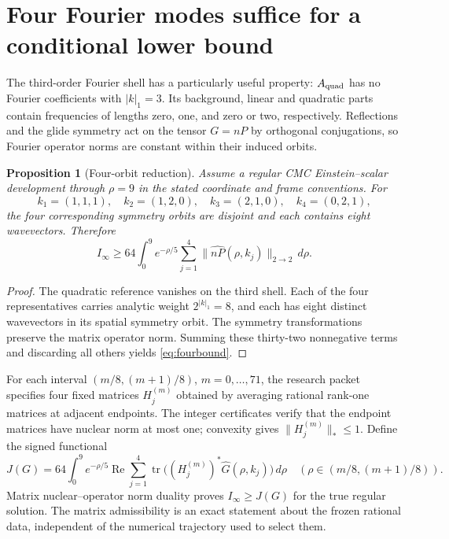 \documentclass[11pt,a4paper]{article}
\newtheorem{proposition}[theorem]{Proposition}
\theoremstyle{remark}
\begin{document}
\section{Four Fourier modes suffice for a conditional lower bound}
The third-order Fourier shell has a particularly useful property: $A_{\rm quad}$ has no Fourier coefficients with $|k|_1=3$. Its background, linear and quadratic parts contain frequencies of lengths zero, one, and zero or two, respectively. Reflections and the glide symmetry act on the tensor $G=nP$ by orthogonal conjugations, so Fourier operator norms are constant within their induced orbits.

\begin{proposition}[Four-orbit reduction]\label{prop:four}
Assume a regular CMC Einstein--scalar development through $\rho=9$ in the stated coordinate and frame conventions. For
\[
k_1=(1,1,1),\quad k_2=(1,2,0),\quad
k_3=(2,1,0),\quad k_4=(0,2,1),
\]
the four corresponding symmetry orbits are disjoint and each contains eight wavevectors. Therefore
\begin{equation}\label{eq:fourbound}
I_\infty\ge64\int_0^9e^{-\rho/5}
\sum_{j=1}^4\|\widehat{nP}(\rho,k_j)\|_{2\to2}\,d\rho.
\end{equation}
\end{proposition}
\begin{proof}
The quadratic reference vanishes on the third shell. Each of the four representatives carries analytic weight $2^{|k|_1}=8$, and each has eight distinct wavevectors in its spatial symmetry orbit. The symmetry transformations preserve the matrix operator norm. Summing these thirty-two nonnegative terms and discarding all others yields \eqref{eq:fourbound}.
\end{proof}

For each interval $(m/8,(m+1)/8)$, $m=0,\ldots,71$, the research packet specifies four fixed matrices $H_j^{(m)}$ obtained by averaging rational rank-one matrices at adjacent endpoints. The integer certificates verify that the endpoint matrices have nuclear norm at most one; convexity gives $\|H_j^{(m)}\|_*\le1$. Define the signed functional
\begin{equation}\label{eq:signed}
J(G)=64\int_0^9 e^{-\rho/5}\operatorname{Re}
\sum_{j=1}^4\operatorname{tr}\big((H_j^{(m)})^*
\widehat G(\rho,k_j)\big)\,d\rho
\quad (\rho\in(m/8,(m+1)/8)).
\end{equation}
Matrix nuclear--operator norm duality proves $I_\infty\ge J(G)$ for the true regular solution. The matrix admissibility is an exact statement about the frozen rational data, independent of the numerical trajectory used to select them.
\end{document}
